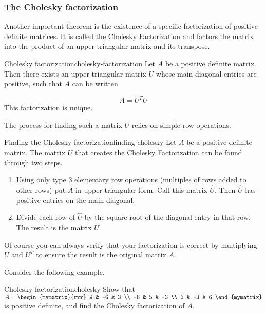 \subsubsection{The Cholesky factorization}

Another important theorem is the existence of a specific factorization of positive definite matrices. It is called the Cholesky Factorization and factors the matrix into the product of an upper triangular matrix and its transpose.

\begin{theorem}{Cholesky factorization}{cholesky-factorization}
Let $A$ be a positive definite matrix. Then
there exists an upper triangular matrix $U$ whose main diagonal entries are positive, such that $A$ can be written

\begin{equation*}
A=
U^TU
\end{equation*}
This factorization is unique.
\end{theorem}

The process for finding such a matrix $U$ relies on simple row operations.

\begin{procedure}{Finding the Cholesky factorization}{finding-cholesky}
Let $A$ be a positive definite matrix. The matrix $U$ that creates the Cholesky Factorization can be found through two steps.
\begin{enumerate}
\item Using only type $3$ elementary row operations (multiples of rows added to other rows) put $A$ in upper triangular form. Call this matrix $\hat{U}$. Then $\hat{U}$ has positive entries on the main diagonal. 
\item Divide each row of $\hat{U}$ by the square root of the diagonal entry in that row. The result is the matrix $U$. 
\end{enumerate}
\end{procedure}

Of course you can always verify that your factorization is correct by multiplying $U$ and $U^T$ to ensure the result is the original matrix $A$. 

Consider the following example.

\begin{example}{Cholesky factorization}{cholesky}
Show that
$A=\begin{mymatrix}{rrr}
9 & -6 & 3 \\ -6 & 5 & -3 \\ 3 & -3 & 6 
\end{mymatrix}$ 
is positive definite, and find the Cholesky factorization of $A$.
\end{example}

